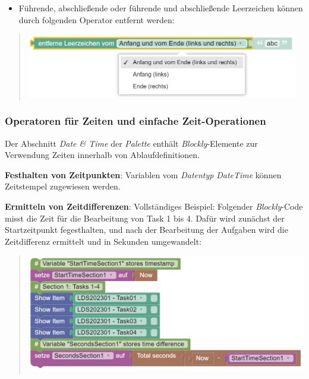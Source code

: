 \documentclass[
  letterpaper,
  DIV=11]{scrreprt}
\providecommand{\tightlist}{%
  \setlength{\itemsep}{0pt}\setlength{\parskip}{0pt}}\usepackage{longtable,booktabs,array}
\begin{document}
\begin{tcolorbox}
\begin{itemize}
\tightlist
\item
  Führende, abschließende oder führende und abschließende Leerzeichen
  können durch folgenden Operator entfernt werden:
\end{itemize}

\begin{quote}
\includegraphics[width=4.6875in,height=\textheight]{img/screenshot-blockly-text-trim-operator-example-01-DEU.png}
\end{quote}

\hypertarget{operatoren-fuxfcr-zeiten-und-einfache-zeit-operationen-1}{%
\subsubsection{Operatoren für Zeiten und einfache
Zeit-Operationen}\label{operatoren-fuxfcr-zeiten-und-einfache-zeit-operationen-1}}

Der Abschnitt \emph{Date \& Time} der \emph{Palette} enthält
\emph{Blockly}-Elemente zur Verwendung Zeiten innerhalb von
Ablaufdefinitionen.

\textbf{Festhalten von Zeitpunkten}: Variablen vom \emph{Datentyp}
\emph{DateTime} können Zeitstempel zugewiesen werden.

\textbf{Ermitteln von Zeitdifferenzen}: Vollständiges Beispiel:
Folgender \emph{Blockly}-Code misst die Zeit für die Bearbeitung von
Task 1 bis 4. Dafür wird zunächst der Startzeitpunkt fegesthalten, und
nach der Bearbeitung der Aufgaben wird die Zeitdifferenz ermittelt und
in Sekunden umgewandelt:

\begin{quote}
\includegraphics[width=5.20833in,height=\textheight]{img/screenshot-blockly-measure-time-difference-example-DEU.png}
\end{quote}


\end{tcolorbox}
\end{document}
